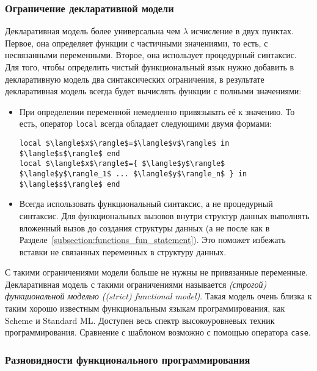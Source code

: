 \subsubsection{Ограничение декларативной модели}

Декларативная модель более универсальна чем $\lambda$ исчисление в двух пунктах. Первое, она определяет функции с частичными значениями, то есть, с несвязанными переменными. Второе, она использует процедурный синтаксис. Для того, чтобы определить чистый функциональный язык нужно добавить в декларативную модель два синтаксических ограничения, в результате декларативная модель всегда будет вычислять функции с полными значениями:

\begin{itemize}

\item{При определении переменной немедленно привязывать её к значению. То есть, оператор \lstinline!local! всегда обладает следующими двумя формами:

  \begin{lstlisting}
local $\langle$x$\rangle$=$\langle$v$\rangle$ in $\langle$s$\rangle$ end
local $\langle$x$\rangle$={ $\langle$y$\rangle$ $\langle$y$\rangle_1$ ... $\langle$y$\rangle_n$ } in $\langle$s$\rangle$ end
\end{lstlisting}
}

\item{Всегда использовать функциональный синтаксис, а не процедурный синтаксис. Для функциональных вызовов внутри структур данных выполнять вложенный вызов до создания структуры данных (а не после как в Разделе~\ref{subsection:functions_fun_statement}). Это поможет избежать вставки не связанных переменных в структуру данных.}
  
\end{itemize}

С такими ограничениями модели больше не нужны не привязанные переменные. Декларативная модель с такими ограничениями называется \emph{(строгой) функциональной моделью ((strict) functional model)}. Такая модель очень близка к таким хорошо известным функциональным языкам программирования, как Scheme и Standard ML. Доступен весь спектр высокоуровневых техник программирования. Сравнение с шаблоном возможно с помощью оператора \lstinline!case!.

\subsubsection{Разновидности функционального программирования}

